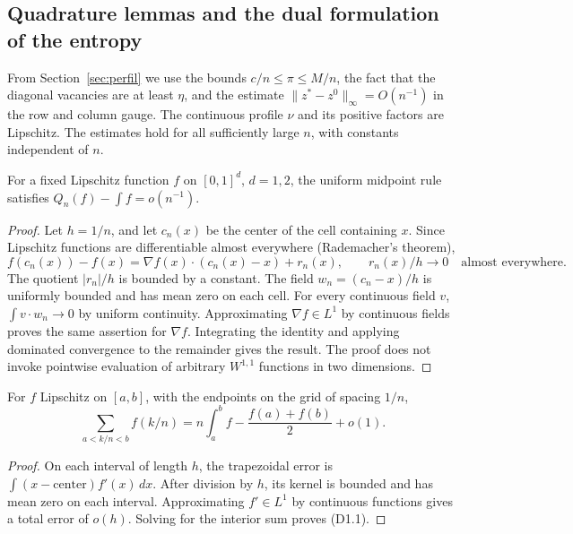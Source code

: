 \subsection{Quadrature lemmas and the dual formulation of the entropy}\label{sec:D01}
From Section~\ref{sec:perfil} we use the bounds $c/n\le\pi\le M/n$, the fact that the diagonal vacancies are
at least $\eta$, and the estimate $\|z^*-z^0\|_\infty=O(n^{-1})$ in the row and column gauge.
The continuous profile $\nu$ and its positive factors are Lipschitz.
The estimates hold for all sufficiently large $n$, with constants independent of $n$.

\begin{lema}\label{lem:puntosmedios}
For a fixed Lipschitz function $f$ on $[0,1]^d$, $d=1,2$,
the uniform midpoint rule satisfies
$Q_n(f)-\int f=o(n^{-1})$.
\end{lema}
\begin{proof}
Let $h=1/n$, and let $c_n(x)$ be the center of the cell containing $x$.
Since Lipschitz functions are differentiable almost everywhere (Rademacher's theorem),
\[
 f(c_n(x))-f(x)=\nabla f(x)\cdot(c_n(x)-x)+r_n(x),
 \qquad r_n(x)/h\longrightarrow0\quad\text{almost everywhere}.
\]
The quotient $|r_n|/h$ is bounded by a constant.
The field $w_n=(c_n-x)/h$ is uniformly bounded and has
mean zero on each cell. For every continuous field $v$,
$\int v\cdot w_n\to0$ by uniform continuity.
Approximating $\nabla f\in L^1$ by continuous fields proves the same assertion
for $\nabla f$. Integrating the identity and applying dominated convergence
to the remainder gives the result.
The proof does not invoke pointwise evaluation of arbitrary $W^{1,1}$ functions
in two dimensions.
\end{proof}

\begin{lema}
For $f$ Lipschitz on $[a,b]$, with the endpoints on the grid of spacing $1/n$,
\[
 \sum_{a<k/n<b}f(k/n)
 =n\int_a^b f-\frac{f(a)+f(b)}2+o(1).             \tag{D1.1}
\]
\end{lema}
\begin{proof}
On each interval of length $h$, the trapezoidal error is
$\int (x-\text{center})f'(x)\,dx$.
After division by $h$, its kernel is bounded and has mean zero
on each interval. Approximating $f'\in L^1$ by continuous functions
gives a total error of $o(h)$. Solving for the interior sum proves (D1.1).
\end{proof}

